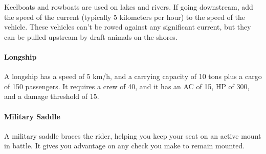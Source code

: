         Keelboats and rowboats are used on lakes and rivers.
        If going downstream, add the speed of the current (typically 5 kilometers per hour) to the speed of the vehicle.
        These vehicles can't be rowed against any significant current, but they can be pulled upstream by draft animals on the shores.
    \paragraph{Longship}
        A longship has a speed of 5 km/h, and a carrying capacity of 10 tons plus a cargo of 150 passengers.
        It requires a crew of 40, and it has an AC of 15, HP of 300, and a damage threshold of 15.
    \paragraph{Military Saddle}
        A military saddle braces the rider, helping you keep your seat on an active mount in battle.
        It gives you advantage on any check you make to remain mounted.
